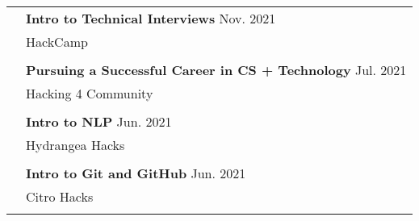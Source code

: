 \documentclass[letterpaper, 11pt]{article}
\begin{document}
\begin{longtable}{p{1.3in}p{4.8in}}
	 & \textbf{Intro to Technical Interviews} \hfill Nov. 2021                                                                                                                                                \\
	 & HackCamp                                                                                                                                                                                               \\
	 &                                                                                                                                                                                                        \\

	 & \textbf{Pursuing a Successful Career in CS + Technology} \hfill Jul. 2021                                                                                                                              \\
	 & Hacking 4 Community                                                                                                                                                                                    \\
	 &                                                                                                                                                                                                        \\

	 & \textbf{Intro to NLP} \hfill Jun. 2021                                                                                                                                                                 \\
	 & Hydrangea Hacks                                                                                                                                                                                        \\
	 &                                                                                                                                                                                                        \\

	 & \textbf{Intro to Git and GitHub} \hfill Jun. 2021                                                                                                                                                      \\
	 & Citro Hacks                                                                                                                                                                                            \\
	 &                                                                                                                                                                                                        \\


\end{longtable}
\end{document}
